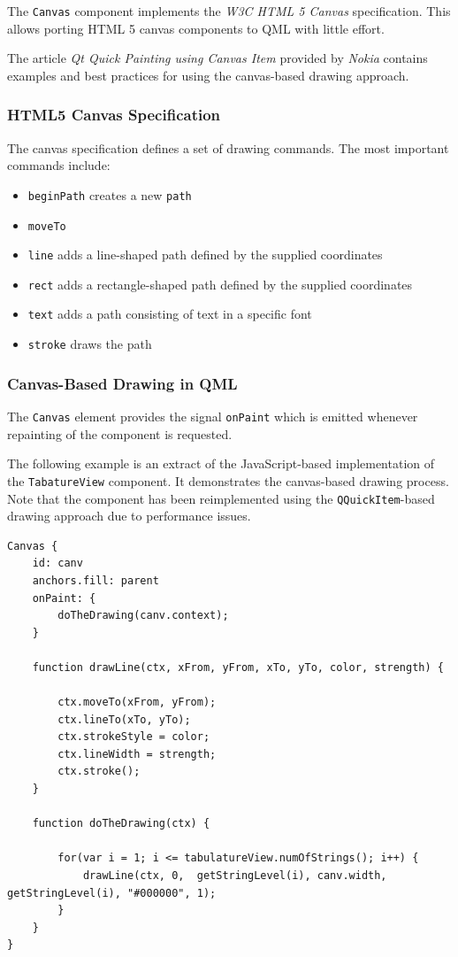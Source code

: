 The {\tt Canvas} component implements the \textit{W3C HTML 5 Canvas} specification. This allows porting HTML 5 canvas components to QML with little effort. 

The article \textit{Qt Quick Painting using Canvas Item} \cite{qtquickpainting2} provided by \textit{Nokia} contains examples and best practices for using the canvas-based drawing approach.

\subsubsection{HTML5 Canvas Specification}
The canvas specification defines a set of drawing commands.
The most important commands include:
\begin{itemize}
	\item{{\tt beginPath} creates a new {\tt path}}
	\item{{\tt moveTo}}
	\item{{\tt line} adds a line-shaped path defined by the supplied coordinates}
	\item{{\tt rect} adds a rectangle-shaped path defined by the supplied coordinates}
	\item{{\tt text} adds a path consisting of text in a specific font}
	\item{{\tt stroke} draws the path}
\end{itemize}

\subsubsection{Canvas-Based Drawing in QML}
The {\tt Canvas} element provides the signal {\tt onPaint} which is emitted whenever repainting of the component is requested. 

The following example is an extract of the JavaScript-based implementation of the {\tt TabatureView} component. It demonstrates the canvas-based drawing process. Note that the component has been reimplemented using the {\tt QQuickItem}-based drawing approach due to performance issues.

\begin{lstlisting}
Canvas {
	id: canv
    anchors.fill: parent
    onPaint: {
        doTheDrawing(canv.context);
    }
    
    function drawLine(ctx, xFrom, yFrom, xTo, yTo, color, strength) {

        ctx.moveTo(xFrom, yFrom);
        ctx.lineTo(xTo, yTo);
        ctx.strokeStyle = color;
        ctx.lineWidth = strength;
        ctx.stroke();
    }
    
    function doTheDrawing(ctx) {
    
        for(var i = 1; i <= tabulatureView.numOfStrings(); i++) {
            drawLine(ctx, 0,  getStringLevel(i), canv.width, getStringLevel(i), "#000000", 1);
        }
 	}
}
\end{lstlisting}

